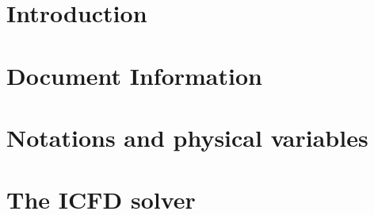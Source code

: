 %
%
%

  \pagebreak
  \setcounter{page}{1}
  \pagebreak
  \setcounter{page}{1}
%
\section{Introduction}
  \clearpage
% 
\section{Document Information}
  \clearpage 
%
\section{Notations and physical variables}
  \clearpage
\section{The ICFD solver}
  \clearpage 
  \clearpage
  \clearpage
  \clearpage
  \clearpage
%


